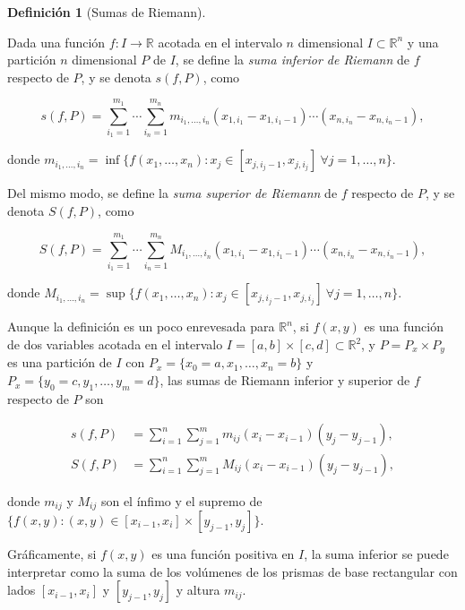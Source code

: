 \documentclass[
  a4paper,
]{scrreport}
\theoremstyle{definition}
\theoremstyle{definition}
\theoremstyle{definition}
\newtheorem{definition}{Definición}[chapter]
\theoremstyle{plain}
\theoremstyle{plain}
\theoremstyle{plain}
\theoremstyle{remark}
\begin{document}
\begin{definition}[Sumas de
Riemann]\protect\hypertarget{def-suma-inferior-superior-riemann-n-dimensional}{}\label{def-suma-inferior-superior-riemann-n-dimensional}

Dada una función \(f:I\to \mathbb{R}\) acotada en el intervalo \(n\)
dimensional \(I\subset \mathbb{R}^n\) y una partición \(n\) dimensional
\(P\) de \(I\), se define la \emph{suma inferior de Riemann} de \(f\)
respecto de \(P\), y se denota \(s(f,P)\), como

\[
s(f,P) = \sum_{i_1=1}^{m_1}\cdots \sum_{i_n=1}^{m_n} m_{i_1,\ldots,i_n} (x_{1,i_1}-x_{1,i_1-1})\cdots (x_{n,i_n}-x_{n,i_n-1}),
\]

donde
\(m_{i_1,\ldots,i_n} = \inf\{f(x_1,\ldots,x_n): x_j\in[x_{j,i_j-1}, x_{j,i_j}]\ \forall j=1,\ldots, n\}\).

Del mismo modo, se define la \emph{suma superior de Riemann} de \(f\)
respecto de \(P\), y se denota \(S(f,P)\), como

\[
S(f,P) = \sum_{i_1=1}^{m_1}\cdots \sum_{i_n=1}^{m_n} M_{i_1,\ldots,i_n} (x_{1,i_1}-x_{1,i_1-1})\cdots (x_{n,i_n}-x_{n,i_n-1}),
\]

donde
\(M_{i_1,\ldots,i_n} = \sup\{f(x_1,\ldots,x_n): x_j\in[x_{j,i_j-1}, x_{j,i_j}]\ \forall j=1,\ldots, n\}\).

\end{definition}

Aunque la definición es un poco enrevesada para \(\mathbb{R}^n\), si
\(f(x,y)\) es una función de dos variables acotada en el intervalo
\(I=[a,b]\times [c,d]\subset \mathbb{R}^2\), y \(P=P_x\times P_y\) es
una partición de \(I\) con \(P_x=\{x_0=a,x_1,\ldots, x_n=b\}\) y
\(P_x=\{y_0=c,y_1,\ldots, y_m=d\}\), las sumas de Riemann inferior y
superior de \(f\) respecto de \(P\) son

\begin{align*}
s(f,P) &= \sum_{i=1}^n \sum_{j=1}^m m_{ij}(x_i-x_{i-1})(y_j-y_{j-1}), \\
S(f,P) &= \sum_{i=1}^n \sum_{j=1}^m M_{ij}(x_i-x_{i-1})(y_j-y_{j-1}),
\end{align*}

donde \(m_{ij}\) y \(M_{ij}\) son el ínfimo y el supremo de
\(\{f(x,y): (x,y)\in [x_{i-1},x_i]\times [y_{j-1},y_j]\}\).

Gráficamente, si \(f(x,y)\) es una función positiva en \(I\), la suma
inferior se puede interpretar como la suma de los volúmenes de los
prismas de base rectangular con lados \([x_{i-1},x_i]\) y
\([y_{j-1},y_j]\) y altura \(m_{ij}\).
\end{document}
